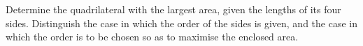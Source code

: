 Determine the quadrilateral with the largest area,
given the lengths of its four sides.
Distinguish the case in which the order of the sides is given, and the case in which the order is to be chosen so as to maximise the enclosed area.

